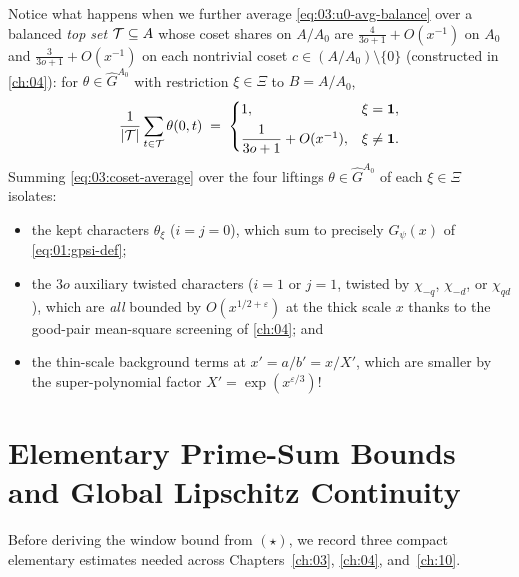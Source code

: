 Notice what happens when we further average \eqref{eq:03:u0-avg-balance} over a balanced \emph{top set} $\mathcal{T} \subseteq A$ whose coset shares on $A / A_0$ are $\frac{4}{3o+1} + O(x^{-1})$ on $A_0$ and $\frac{3}{3o+1} + O(x^{-1})$ on each nontrivial coset $c \in (A/A_0) \setminus \{0\}$ (constructed in \cref{ch:04}):
for $\theta \in \widehat{G}^{A_0}$ with restriction $\xi \in \Xi$ to $B = A/A_0$,
\begin{equation}
\label{eq:03:coset-average}
  \frac{1}{|\mathcal{T}|}\sum_{t \in \mathcal{T}} \theta(0, t) \;=\;
  \begin{cases}
    1, & \xi = \mathbf{1}, \\[4pt]
    \dfrac{1}{3o + 1} + O(x^{-1}), & \xi \neq \mathbf{1}.
  \end{cases}
\end{equation}
Summing \eqref{eq:03:coset-average} over the four liftings $\theta \in \widehat{G}^{A_0}$ of each $\xi \in \Xi$ isolates:
\begin{itemize}
\item the kept characters $\theta_\xi$ ($i = j = 0$), which sum to precisely $G_\psi(x)$ of \eqref{eq:01:gpsi-def};
\item the $3o$ auxiliary twisted characters ($i = 1$ or $j = 1$, twisted by $\chi_{-q}$, $\chi_{-d}$, or $\chi_{qd}$), which are \emph{all} bounded by $O(x^{1/2+\varepsilon})$ at the thick scale $x$ thanks to the good-pair mean-square screening of \cref{ch:04}; and
\item the thin-scale background terms at $x' = a / b' = x / X'$, which are smaller by the super-polynomial factor $X' = \exp(x^{\varepsilon/3})$!
\end{itemize}

\section{Elementary Prime-Sum Bounds and Global Lipschitz Continuity}
\label{sec:03:elementary-bounds}

Before deriving the window bound from $(\star)$, we record three compact elementary estimates needed across Chapters~\ref{ch:03}, \ref{ch:04}, and~\ref{ch:10}.

